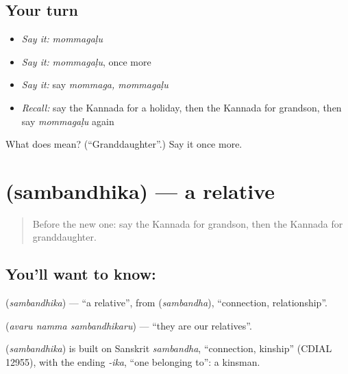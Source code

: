 \subsection*{Your turn}
\begin{itemize}
\raggedright
  \item \emph{Say it:} \emph{mommagaḷu}
  \item \emph{Say it:} \emph{mommagaḷu}, once more
  \item \emph{Say it:} say \emph{mommaga, mommagaḷu}
  \item \emph{Recall:} say the Kannada for a holiday, then the Kannada for grandson, then say \emph{mommagaḷu} again
\end{itemize}

\begin{tcolorbox}[breakable,colback=teal!4,colframe=teal!35!black,title={Before you move on}]
What does  mean? (\textquotedblleft{}Granddaughter\textquotedblright{}.) Say it once more.
\end{tcolorbox}
\section[\texorpdfstring{\kn{ಸಂಬಂಧಿಕ} (sambandhika)}{ಸಂಬಂಧಿಕ (sambandhika)}]{ (sambandhika) — a relative}

\label{lesson:KA-C90-relative}



\begin{quote}
Before the new one: say the Kannada for grandson, then the Kannada for granddaughter.
\end{quote}

\subsection*{You'll want to know: }
\textbf{} (\emph{sambandhika}) — \textquotedblleft{}a relative\textquotedblright{}, from \textbf{} (\emph{sambandha}), \textquotedblleft{}connection, relationship\textquotedblright{}.

\textbf{  } (\emph{avaru namma sambandhikaru}) — \textquotedblleft{}they are our relatives\textquotedblright{}.

\begin{cousinweb}
\textbf{} (\emph{sambandhika}) is built on Sanskrit \emph{sambandha}, \textquotedblleft{}connection, kinship\textquotedblright{} (CDIAL 12955), with the ending \emph{-ika}, \textquotedblleft{}one belonging to\textquotedblright{}: a kinsman.
\end{cousinweb}

